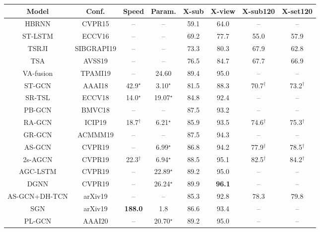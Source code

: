 \documentclass[sigconf]{acmart}
\begin{document}
\begin{table*}
  \begin{center}
  \begin{tabular}{cc|cc|cc|cc}
  \hline
  Model & Conf. & Speed & Param. & X-sub & X-view & X-sub120 & X-set120 \\
  \hline
  \hline
  HBRNN \cite{du2015hierarchical} & CVPR15 & -- & -- & 59.1 & 64.0 & -- & -- \\
  ST-LSTM \cite{liu2016spatio} & ECCV16 & -- & -- & 69.2 & 77.7 & 55.0 & 57.9 \\
  TSRJI \cite{caetano2019skeleton} & SIBGRAPI19 & -- & -- & 73.3 & 80.3 & 67.9 & 62.8 \\
  TSA \cite{caetano2019skelemotion} & AVSS19 & -- & -- & 76.5 & 84.7 & 67.7 & 66.9 \\
  VA-fusion \cite{zhang2019view} & TPAMI19 & -- & 24.60 & 89.4 & 95.0 & -- & -- \\
  \hline
  \hline
  ST-GCN \cite{yan2018spatial} & AAAI18 & 42.9$^\star$ & 3.10$^\star$ & 81.5 & 88.3 & 70.7$^\dagger$ & 73.2$^\dagger$ \\
  SR-TSL \cite{si2018skeleton} & ECCV18 & 14.0$^\star$ & 19.07$^\star$ & 84.8 & 92.4 & -- & -- \\
  PB-GCN \cite{thakkar2018part} & BMVC18 & -- & -- & 87.5 & 93.2 & -- & -- \\
  RA-GCN \cite{song2019richly} & ICIP19 & 18.7$^\dagger$ & 6.21$^\star$ & 85.9 & 93.5 & 74.6$^\dagger$ & 75.3$^\dagger$ \\
  GR-GCN \cite{gao2019optimized} & ACMMM19 & -- & -- & 87.5 & 94.3 & -- & -- \\
  AS-GCN \cite{li2019actional} & CVPR19 & -- & 6.99$^\star$ & 86.8 & 94.2 & 77.9$^\dagger$ & 78.5$^\dagger$ \\
  2s-AGCN \cite{shi2019two} & CVPR19 & 22.3$^\dagger$ & 6.94$^\star$ & 88.5 & 95.1 & 82.5$^\dagger$ & 84.2$^\dagger$ \\
  AGC-LSTM \cite{si2019attention} & CVPR19 & -- & 22.89$^\star$ & 89.2 & 95.0 & -- & -- \\
  DGNN \cite{shi2019skeleton} & CVPR19 & -- & 26.24$^\star$ & 89.9 & {\bf 96.1} & -- & -- \\
  AS-GCN+DH-TCN \cite{papadopoulos2019vertex} & arXiv19 & -- & -- & 85.3 & 92.8 & 78.3 & 79.8 \\
  SGN \cite{zhang2019semantics} & arXiv19 & {\bf 188.0} & 1.8 & 86.6 & 93.4 & -- & -- \\
  PL-GCN \cite{huang2020part} & AAAI20 & -- & 20.70$^\star$ & 89.2 & 95.0 & -- & -- \\

\end{tabular}
\end{center}
\end{table*}
\end{document}
